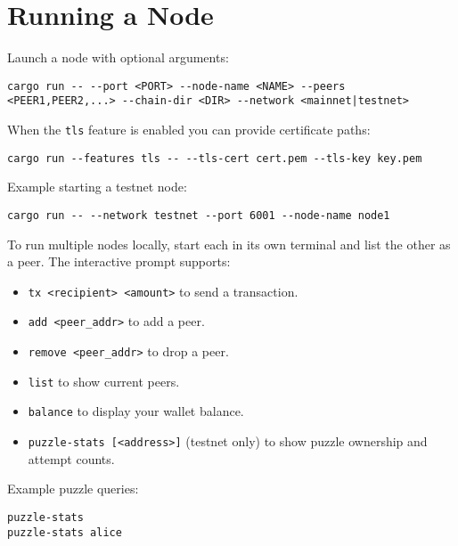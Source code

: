 \chapter{Running a Node}
Launch a node with optional arguments:
\begin{verbatim}
cargo run -- --port <PORT> --node-name <NAME> --peers <PEER1,PEER2,...> --chain-dir <DIR> --network <mainnet|testnet>
\end{verbatim}
When the \texttt{tls} feature is enabled you can provide certificate paths:
\begin{verbatim}
cargo run --features tls -- --tls-cert cert.pem --tls-key key.pem
\end{verbatim}
Example starting a testnet node:
\begin{verbatim}
cargo run -- --network testnet --port 6001 --node-name node1
\end{verbatim}
To run multiple nodes locally, start each in its own terminal and list the other as a peer. The interactive prompt supports:
\begin{itemize}
\item \texttt{tx <recipient> <amount>} to send a transaction.
\item \texttt{add <peer\_addr>} to add a peer.
\item \texttt{remove <peer\_addr>} to drop a peer.
\item \texttt{list} to show current peers.
\item \texttt{balance} to display your wallet balance.
\item \texttt{puzzle-stats [<address>]} (testnet only) to show puzzle ownership and attempt counts.
\end{itemize}
Example puzzle queries:
\begin{verbatim}
puzzle-stats
puzzle-stats alice
\end{verbatim}
